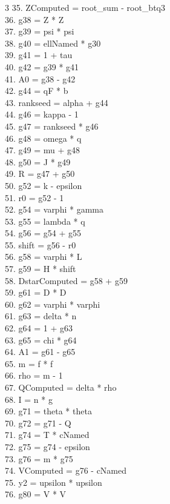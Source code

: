 \documentclass[10pt]{article}
\begin{document}
\begin{multicols}{3}
35. ZComputed = root\_sum - root\_btq3\\
36. g38 = Z * Z\\
37. g39 = psi * psi\\
38. g40 = ellNamed * g30\\
39. g41 = 1 + tau\\
40. g42 = g39 * g41\\
41. A0 = g38 - g42\\
42. g44 = qF * b\\
43. rankseed = alpha + g44\\
44. g46 = kappa - 1\\
45. g47 = rankseed * g46\\
46. g48 = omega * q\\
47. g49 = mu + g48\\
48. g50 = J * g49\\
49. R = g47 + g50\\
50. g52 = k - epsilon\\
51. r0 = g52 - 1\\
52. g54 = varphi * gamma\\
53. g55 = lambda * q\\
54. g56 = g54 + g55\\
55. shift = g56 - r0\\
56. g58 = varphi * L\\
57. g59 = H * shift\\
58. DstarComputed = g58 + g59\\
59. g61 = D * D\\
60. g62 = varphi * varphi\\
61. g63 = delta * n\\
62. g64 = 1 + g63\\
63. g65 = chi * g64\\
64. A1 = g61 - g65\\
65. m = f * f\\
66. rho = m - 1\\
67. QComputed = delta * rho\\
68. I = n * g\\
69. g71 = theta * theta\\
70. g72 = g71 - Q\\
71. g74 = T * cNamed\\
72. g75 = g74 - epsilon\\
73. g76 = m * g75\\
74. VComputed = g76 - cNamed\\
75. y2 = upsilon * upsilon\\
76. g80 = V * V\\

\end{multicols}
\end{document}
